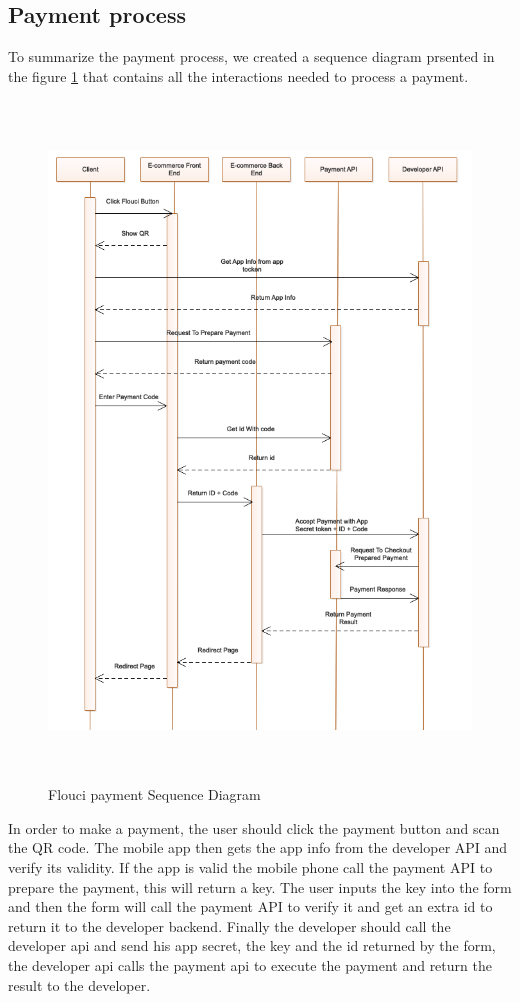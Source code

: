 \begin{spacing}{1.2}
\section{Payment process}
To summarize the payment process, we created a sequence diagram prsented in the figure \ref{fig:FPSD} that contains all the interactions needed to process a payment.
\begin{figure}[H]\centering
\includegraphics[width=\textwidth,height=18cm]{Payment_Sequence_Diagram.png}
\caption{Flouci payment Sequence Diagram}
\label{fig:FPSD}
\end{figure}
In order to make a payment, the user should click the payment button and scan the QR code. The mobile app then gets the app info from the developer API and verify its validity. If the app is valid the mobile phone call the payment API to prepare the payment, this will return a key. The user inputs the key into the form and then the form will call the payment API to verify it and get an extra id to return it to the developer backend. Finally the developer should call the developer api and send his app secret, the key and the id returned by the form, the developer api calls the payment api to execute the payment and return the result to the developer.

\end{spacing}
